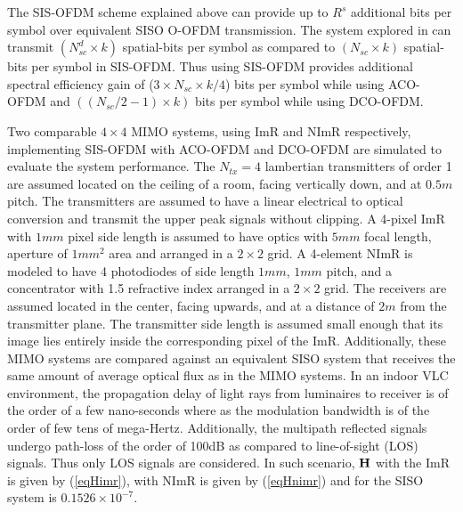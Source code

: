 \documentclass[12pt,letterpaper,onecolumn]{article} %
\newcommand{\vm}[1]{{\bf{#1}}}
\begin{document}
The SIS-OFDM scheme explained above can provide up to $R^s$ additional bits per symbol over equivalent SISO O-OFDM transmission. The system explored in \cite{zha12a} can transmit $(N_{sc}^d\times k)$ spatial-bits per symbol as compared to $(N_{sc}\times k)$ spatial-bits per symbol in SIS-OFDM. Thus using SIS-OFDM provides additional spectral efficiency gain of ($3\times N_{sc}\times k/4$) bits per symbol while using ACO-OFDM and $((N_{sc}/2 -1)\times k)$ bits per symbol while using DCO-OFDM.

Two comparable $4\times 4$ MIMO systems, using ImR and NImR respectively, implementing SIS-OFDM with ACO-OFDM and DCO-OFDM are simulated to evaluate the system performance. The $N_{tx}=4$ lambertian transmitters of order 1 are assumed located on the ceiling of a room, facing vertically down, and at $0.5m$ pitch. The transmitters are assumed to have a linear electrical to optical conversion and transmit the upper peak signals without clipping. A 4-pixel ImR with $1mm$ pixel side length is assumed to have optics with $5mm$ focal length, aperture of $1mm^2$ area and arranged in a $2\times 2$ grid. A 4-element NImR is modeled to have 4 photodiodes of side length $1mm$, $1mm$ pitch, and a concentrator with 1.5 refractive index arranged in a $2\times 2$ grid. The receivers are assumed located in the center, facing upwards, and at a distance of $2m$ from the transmitter plane. The transmitter side length is assumed small enough that its image lies entirely inside the corresponding pixel of the ImR. {\color{red}Additionally, these MIMO systems are compared against an equivalent SISO system that receives the same amount of average optical flux as in the MIMO systems.} In an indoor VLC environment, the propagation delay of light rays from luminaires to receiver is of the order of a few nano-seconds where as the modulation bandwidth is of the order of few tens of mega-Hertz. Additionally, the multipath reflected signals undergo path-loss of the order of 100dB as compared to line-of-sight (LOS) signals. Thus only LOS signals are considered. In such scenario, $\vm{H}$ with the ImR is given by (\ref{eqHimr}), with NImR is given by (\ref{eqHnimr}) {\color{red}and for the SISO system is $0.1526\times 10^{-7}$.}
\end{document}
